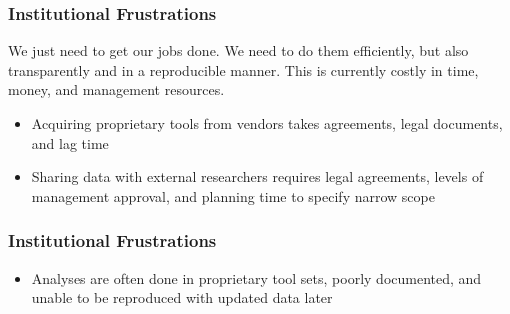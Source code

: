 \documentclass[12pt,handout]{beamer}
\begin{document}
\begin{frame}
\frametitle{Institutional Frustrations}
We just need to get our jobs done. We need to do them efficiently, but also transparently and in a reproducible manner. This is currently costly in time, money, and management resources.
  \begin{itemize}
  \item Acquiring proprietary tools from vendors takes agreements, legal documents, and lag time
  \pause
  \item Sharing data with external researchers requires legal agreements, levels of management approval, and planning time to specify narrow scope
  \end {itemize}
\end{frame}

{
\begin{frame}[plain]
\end{frame}
}

\begin{frame}
\frametitle{Institutional Frustrations}
  \begin{itemize}
  \item Analyses are often done in proprietary tool sets, poorly documented, and unable to be reproduced with updated data later
  \end {itemize}
\end{frame}
\end{document}
